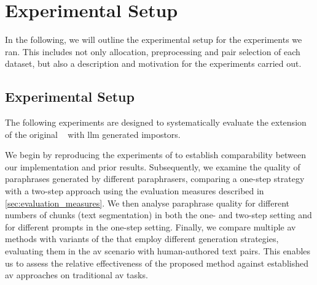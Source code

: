 \chapter{Experimental Setup}
\label{chap:experimental_setup}

In the following, we will outline the experimental setup for the experiments we ran.
This includes not only allocation, preprocessing and pair selection of each dataset, but also a description and motivation for the experiments carried out.






\section{Experimental Setup}
\label{sec:experimental_setup}

The following experiments are designed to systematically evaluate the extension of the original \impAppr{}~\citep{koppel_determining_2014} with \ac{llm} generated impostors. 

We begin by reproducing the experiments of \citet{koppel_determining_2014} to establish comparability between our implementation and prior results.
Subsequently, we examine the quality of paraphrases generated by different paraphrasers, comparing a one-step strategy with a two-step approach using the evaluation measures described in \autoref{sec:evaluation_measures}.
We then analyse paraphrase quality for different numbers of chunks (text segmentation) in both the one- and two-step setting and for different prompts in the one-step setting.
Finally, we compare multiple \ac{av} methods with variants of the \impAppr{} that employ different \imp{} generation strategies, evaluating them in the \ac{av} scenario with human-authored text pairs.
This enables us to assess the relative effectiveness of the proposed method against established \ac{av} approaches on traditional \ac{av} tasks.










% 

% 

% 







